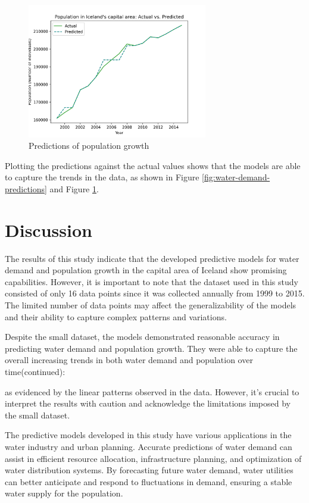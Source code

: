 \documentclass{article}
\begin{document}
\begin{figure}[!hb]
    \centering
    \includegraphics[width=0.7\textwidth]{../figures/population-hot-water-area-actual-vs-predicted.png}
    \caption{Predictions of population growth}
    \label{fig:population-predictions}
\end{figure}

Plotting the predictions against the actual values shows that the models are able to capture the trends in the data, as shown in Figure \ref{fig:water-demand-predictions} and Figure \ref{fig:population-predictions}.

\newpage

\section{Discussion}
The results of this study indicate that the developed predictive models for water demand and population growth in the capital area of Iceland show promising capabilities. However, it is important to note that the dataset used in this study consisted of only 16 data points since it was collected annually from 1999 to 2015. The limited number of data points may affect the generalizability of the models and their ability to capture complex patterns and variations.

Despite the small dataset, the models demonstrated reasonable accuracy in predicting water demand and population growth. They were able to capture the overall increasing trends in both water demand and population over time(continued):

as evidenced by the linear patterns observed in the data. However, it's crucial to interpret the results with caution and acknowledge the limitations imposed by the small dataset.

The predictive models developed in this study have various applications in the water industry and urban planning. Accurate predictions of water demand can assist in efficient resource allocation, infrastructure planning, and optimization of water distribution systems. By forecasting future water demand, water utilities can better anticipate and respond to fluctuations in demand, ensuring a stable water supply for the population.
\end{document}
